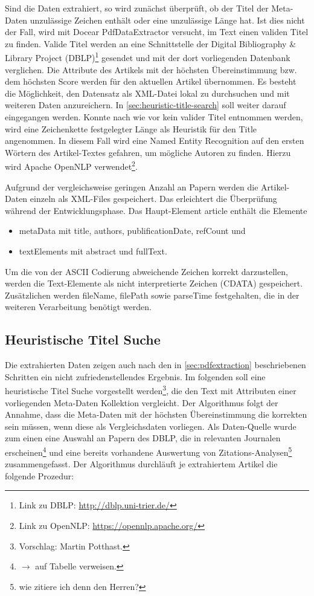 Sind die Daten extrahiert, so wird zunächst überprüft, ob der Titel der
Meta-Daten unzulässige Zeichen enthält oder eine unzulässige Länge
hat. Ist dies nicht der Fall, wird mit Docear PdfDataExtractor
versucht, im Text einen validen Titel zu finden. Valide Titel
werden an eine Schnittstelle der Digital Bibliography \& Library
Project (DBLP)\footnote{Link zu DBLP: \url{http://dblp.uni-trier.de/}}
gesendet und mit der dort vorliegenden Datenbank verglichen. Die Attribute des Artikels mit
der höchsten Übereinstimmung bzw. dem höchsten Score werden für den aktuellen
Artikel übernommen. Es besteht die Möglichkeit, den Datensatz als
XML-Datei lokal zu durchsuchen und mit weiteren Daten anzureichern.
In \autoref{sec:heuristic-title-search} soll weiter darauf
eingegangen werden.
Konnte nach wie vor kein valider Titel entnommen
werden, wird eine Zeichenkette festgelegter Länge als Heuristik für
den Title angenommen. In diesem Fall wird eine Named Entity
Recognition auf den ersten Wörtern des Artikel-Textes gefahren, um mögliche
Autoren zu finden. Hierzu wird Apache OpenNLP verwendet\footnote{Link zu
  OpenNLP: \url{https://opennlp.apache.org/}}.

Aufgrund der vergleichsweise geringen Anzahl an Papern werden die
Artikel-Daten einzeln als XML-Files gespeichert. Das erleichtert die
Überprüfung während der Entwicklungsphase. Das Haupt-Element
article enthält die Elemente 
\begin{itemize}
\item metaData mit title, authors, publificationDate, refCount und
\item textElements mit abstract und fullText. 
\end{itemize}

Um die von der ASCII Codierung abweichende Zeichen korrekt darzustellen,
werden die Text-Elemente  als nicht interpretierte Zeichen (CDATA) gespeichert.
Zusätzlichen werden fileName, filePath sowie parseTime festgehalten,
die in der weiteren Verarbeitung benötigt werden. 

\subsection{Heuristische Titel Suche}\label{sec:heuristic-title-search}

Die extrahierten Daten zeigen auch nach den in \autoref{sec:pdfextraction}
beschriebenen Schritten ein nicht zufriedenstellendes Ergebnis. Im folgenden soll eine heuristische
Titel Suche vorgestellt werden\footnote{Vorschlag: Martin Potthast.}, die den Text mit Attributen einer
vorliegenden Meta-Daten Kollektion vergleicht. Der Algorithmus
folgt der Annahme, dass die Meta-Daten mit der höchsten Übereinstimmung
die korrekten sein müssen, wenn diese als Vergleichsdaten
vorliegen. Als Daten-Quelle wurde zum einen eine Auswahl an Papern des DBLP, die in relevanten Journalen erscheinen\footnote{$\rightarrow$ auf
  Tabelle verweisen.} und eine bereits vorhandene Auswertung von
Zitations-Analysen\footnote{wie zitiere ich denn den Herren?}
zusammengefasst. Der Algorithmus durchläuft je extrahiertem 
Artikel die folgende Prozedur:

